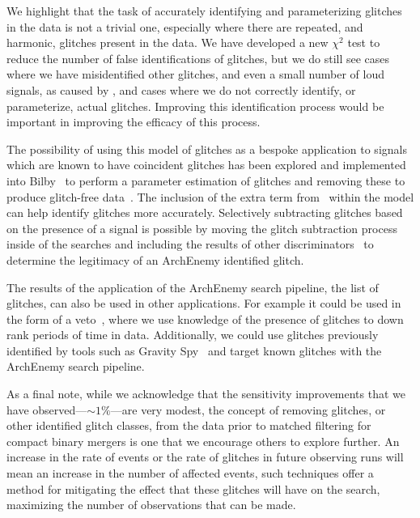 We highlight that the task of accurately identifying and parameterizing \scl{} glitches in the data is not a trivial one, especially where there are repeated, and harmonic, glitches present in the data. We have developed a new $\chi^{2}$ test to reduce the number of false identifications of \scl{} glitches, but we do still see cases where we have misidentified other glitches, and even a small number of loud \gw{} signals, as caused by \scl, and cases where we do not correctly identify, or parameterize, actual \scl{} glitches. Improving this identification process would be important in improving the efficacy of this process.

The possibility of using this model of \scl{} glitches as a bespoke application to \gw{} signals which are known to have coincident \scl{} glitches has been explored and implemented into Bilby~\cite{BILBY:2019} to perform a parameter estimation of \scl{} glitches and removing these to produce glitch-free data~\cite{Udall:2023}. The inclusion of the extra term from~\cite{Was_Subtract:2021} within the model can help identify \scl{} glitches more accurately. Selectively subtracting glitches based on the presence of a \gw{} signal is possible by moving the glitch subtraction process inside of the \gw{} searches and including the results of other \gw{} discriminators~\cite{rw_snr_eq:2012, McIsaac_Chi:2022} to determine the legitimacy of an ArchEnemy identified glitch.

The results of the application of the ArchEnemy search pipeline, the list of \scl{} glitches, can also be used in other applications. For example it could be used in the form of a veto~\cite{O2O3_DetChar:2021}, where we use knowledge of the presence of \scl{} glitches to down rank periods of time in \gw{} data. Additionally, we could use \scl{} glitches previously identified by tools such as Gravity Spy~\cite{gravityspy:2023} and target known \scl{} glitches with the ArchEnemy search pipeline.

As a final note, while we acknowledge that the sensitivity improvements that we have observed---${\sim} 1\%$---are very modest, the concept of removing \scl{} glitches, or other identified glitch classes, from the data prior to matched filtering for compact binary mergers is one that we encourage others to explore further. An increase in the rate of events or the rate of \scl{} glitches in future observing runs will mean an increase in the number of affected events, such techniques offer a method for mitigating the effect that these glitches will have on the search, maximizing the number of observations that can be made.
%

